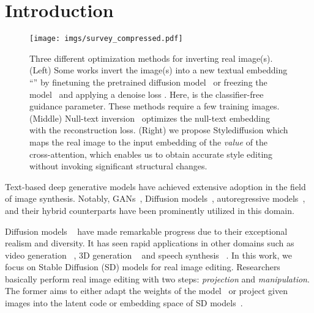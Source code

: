 \documentclass[twocolumn]{svjour3}          \smartqed  \usepackage{graphicx}
\begin{document}
\section{Introduction}
\label{intro}

\begin{figure*}[t]
    \centering
\texttt{[image: imgs/survey\_compressed.pdf]}\vspace{-2mm}
        \caption{Three different optimization methods for inverting real image(s). (Left) Some works invert the image(s) into a new textual embedding “” by finetuning the pretrained diffusion model~\citep{Kawar2022ImagicTR, valevski2022unitune, ruiz2022dreambooth} or freezing the model~\citep{kumari2022multi} and applying a denoise loss . 
        Here,  is the classifier-free guidance parameter. These methods require a few training images. 
        (Middle) Null-text inversion~\citep{mokady2022null} optimizes the null-text embedding with the reconstruction loss. (Right) we propose Stylediffusion which maps the real image to the input embedding of the \textit{value} of the cross-attention, which enables us to obtain accurate style editing without invoking significant structural changes.}
    \label{fig:survey}\vspace{-2mm}
\end{figure*}




Text-based deep generative models have achieved extensive adoption in the field of image synthesis. Notably, GANs~\citep{patashnik2021styleclip,gal2021stylegan,kang2023gigagan,Sauer2023ICML}, Diffusion models~\citep{saharia2022photorealistic,ramesh2022hierarchical,gafni2022make}, autoregressive models~\citep{yu2022scaling}, and their hybrid counterparts have been prominently utilized in this domain.

Diffusion models ~\citep{ramesh2022hierarchical,saharia2022photorealistic,rombach2021highresolution} have made remarkable progress due to their exceptional realism and diversity. It has seen rapid applications in other domains such as video generation ~\citep{khachatryan2023text2video,wu2022tune,zhou2022magicvideo}, 3D generation ~\citep{poole2022dreamfusion,lin2023magic3d,wang2023prolificdreamer} and speech synthesis ~\citep{jeong2021diff,huang2022fastdiff,koizumi2022specgrad}.  In this work, we focus on Stable Diffusion (SD) models for real image editing.
Researchers basically perform real image editing with two steps: \textit{projection} and \textit{manipulation}. The former aims to either adapt the weights of the model~\citep{song2020denoising,liu2023accelerating,kim2022diffusionclip,xiao2023fastcomposer} or project given
images into the latent code or embedding space of SD models~\citep{mokady2022null,gal2022image,avrahami2023break,han2023highly}.
\end{document}
